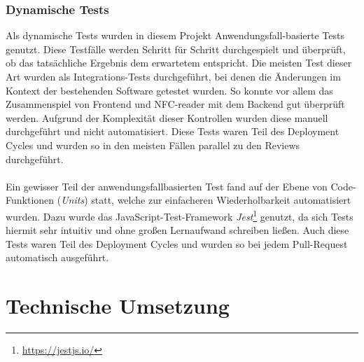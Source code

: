 \documentclass[10pt, a4paper]{article}
\begin{document}
\begin{onehalfspace}
  \subsubsection*{Dynamische Tests}
    Als dynamische Tests wurden in diesem Projekt Anwendungsfall-basierte Tests genutzt.
    Diese Testfälle werden Schritt für Schritt \glqq durchgespielt\grqq{} und überprüft, ob das tatsächliche Ergebnis dem erwartetem entspricht.
    Die meisten Test  dieser Art wurden als Integrations-Tests durchgeführt, bei denen die Änderungen im Kontext der bestehenden Software getestet wurden.
    So konnte vor allem das Zusammenspiel von Frontend und NFC-reader mit dem Backend gut überprüft werden.
    Aufgrund der Komplexität dieser Kontrollen wurden diese manuell durchgeführt und nicht automatisiert.
    Diese Tests waren Teil des Deployment Cycles und wurden so in den meisten Fällen parallel zu den Reviews durchgeführt.
    \\~\\
    Ein gewisser Teil der anwendungsfallbasierten Test fand auf der Ebene von Code-Funktionen (\textit{Units}) statt, welche zur einfacheren Wiederholbarkeit automatisiert wurden.
    Dazu wurde das JavaScript-Test-Framework \textit{Jest}\footnote{\raggedright\url{https://jestjs.io/}} genutzt, da sich Tests hiermit sehr intuitiv und ohne großen Lernaufwand schreiben ließen.
    Auch diese Tests waren Teil des Deployment Cycles und wurden so bei jedem Pull-Request automatisch ausgeführt.

\section{Technische Umsetzung}

\end{onehalfspace}
\end{document}
